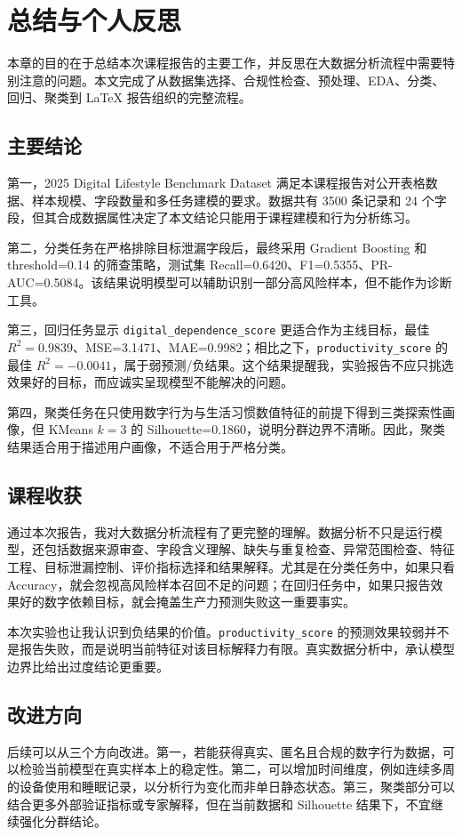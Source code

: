 \section{总结与个人反思}

本章的目的在于总结本次课程报告的主要工作，并反思在大数据分析流程中需要特别注意的问题。本文完成了从数据集选择、合规性检查、预处理、EDA、分类、回归、聚类到 LaTeX 报告组织的完整流程。

\subsection{主要结论}

第一，2025 Digital Lifestyle Benchmark Dataset 满足本课程报告对公开表格数据、样本规模、字段数量和多任务建模的要求。数据共有 3500 条记录和 24 个字段，但其合成数据属性决定了本文结论只能用于课程建模和行为分析练习。

第二，分类任务在严格排除目标泄漏字段后，最终采用 Gradient Boosting 和 threshold=0.14 的筛查策略，测试集 Recall=0.6420、F1=0.5355、PR-AUC=0.5084。该结果说明模型可以辅助识别一部分高风险样本，但不能作为诊断工具。

第三，回归任务显示 \texttt{digital\_dependence\_score} 更适合作为主线目标，最佳 $R^2=0.9839$、MSE=3.1471、MAE=0.9982；相比之下，\texttt{productivity\_score} 的最佳 $R^2=-0.0041$，属于弱预测/负结果。这个结果提醒我，实验报告不应只挑选效果好的目标，而应诚实呈现模型不能解决的问题。

第四，聚类任务在只使用数字行为与生活习惯数值特征的前提下得到三类探索性画像，但 KMeans $k=3$ 的 Silhouette=0.1860，说明分群边界不清晰。因此，聚类结果适合用于描述用户画像，不适合用于严格分类。

\subsection{课程收获}

通过本次报告，我对大数据分析流程有了更完整的理解。数据分析不只是运行模型，还包括数据来源审查、字段含义理解、缺失与重复检查、异常范围检查、特征工程、目标泄漏控制、评价指标选择和结果解释。尤其是在分类任务中，如果只看 Accuracy，就会忽视高风险样本召回不足的问题；在回归任务中，如果只报告效果好的数字依赖目标，就会掩盖生产力预测失败这一重要事实。

本次实验也让我认识到负结果的价值。\texttt{productivity\_score} 的预测效果较弱并不是报告失败，而是说明当前特征对该目标解释力有限。真实数据分析中，承认模型边界比给出过度结论更重要。

\subsection{改进方向}

后续可以从三个方向改进。第一，若能获得真实、匿名且合规的数字行为数据，可以检验当前模型在真实样本上的稳定性。第二，可以增加时间维度，例如连续多周的设备使用和睡眠记录，以分析行为变化而非单日静态状态。第三，聚类部分可以结合更多外部验证指标或专家解释，但在当前数据和 Silhouette 结果下，不宜继续强化分群结论。
